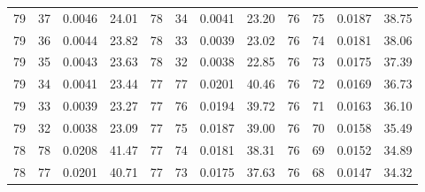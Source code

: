\begin{tabular}{llll|llll|llll}
79 & 37 & 0.0046 & 24.01 & 78 & 34 & 0.0041 & 23.20 & 76 & 75 & 0.0187 & 38.75\\
79 & 36 & 0.0044 & 23.82 & 78 & 33 & 0.0039 & 23.02 & 76 & 74 & 0.0181 & 38.06\\
79 & 35 & 0.0043 & 23.63 & 78 & 32 & 0.0038 & 22.85 & 76 & 73 & 0.0175 & 37.39\\
79 & 34 & 0.0041 & 23.44 & 77 & 77 & 0.0201 & 40.46 & 76 & 72 & 0.0169 & 36.73\\
79 & 33 & 0.0039 & 23.27 & 77 & 76 & 0.0194 & 39.72 & 76 & 71 & 0.0163 & 36.10\\
79 & 32 & 0.0038 & 23.09 & 77 & 75 & 0.0187 & 39.00 & 76 & 70 & 0.0158 & 35.49\\
78 & 78 & 0.0208 & 41.47 & 77 & 74 & 0.0181 & 38.31 & 76 & 69 & 0.0152 & 34.89\\
78 & 77 & 0.0201 & 40.71 & 77 & 73 & 0.0175 & 37.63 & 76 & 68 & 0.0147 & 34.32\\
\bottomrule
\end{tabular}
\newpage
